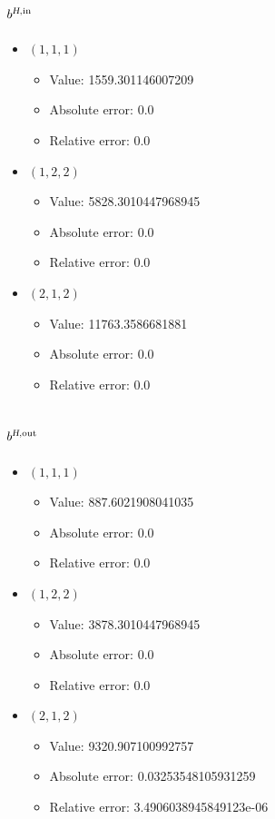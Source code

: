 \documentclass{article}%
\begin{document}
\subsection{$b^{\textsl{H},\text{in}}$}%
\begin{itemize}%
	\item $(1, 1, 1)$%
	\begin{itemize}%
		\item Value: 1559.301146007209%
		\item Absolute error: 0.0%
		\item Relative error: 0.0%
	\end{itemize}%
	\item $(1, 2, 2)$%
	\begin{itemize}%
		\item Value: 5828.3010447968945%
		\item Absolute error: 0.0%
		\item Relative error: 0.0%
	\end{itemize}%
	\item $(2, 1, 2)$%
	\begin{itemize}%
		\item Value: 11763.3586681881%
		\item Absolute error: 0.0%
		\item Relative error: 0.0%
	\end{itemize}%
\end{itemize}%
\subsection{$b^{\textsl{H},\text{out}}$}%
\begin{itemize}%
	\item $(1, 1, 1)$%
	\begin{itemize}%
		\item Value: 887.6021908041035%
		\item Absolute error: 0.0%
		\item Relative error: 0.0%
	\end{itemize}%
	\item $(1, 2, 2)$%
	\begin{itemize}%
		\item Value: 3878.3010447968945%
		\item Absolute error: 0.0%
		\item Relative error: 0.0%
	\end{itemize}%
	\item $(2, 1, 2)$%
	\begin{itemize}%
		\item Value: 9320.907100992757%
		\item Absolute error: 0.03253548105931259%
		\item Relative error: 3.4906038945849123e-06%
	\end{itemize}%
\end{itemize}%
\end{document}
